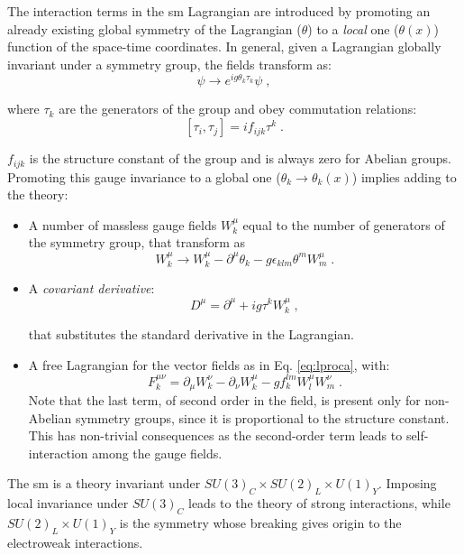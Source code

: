The interaction terms in the \gls{sm} Lagrangian are introduced by promoting an already existing global symmetry of the Lagrangian ($\theta$) to a \textit{local} one ($\theta(x)$) function of the space-time coordinates. 
In general, given a Lagrangian globally invariant under a symmetry group, the fields transform as:
\begin{equation}
\psi \rightarrow e^{ig\theta_k \tau_k} \psi  \; ,
\end{equation}

\noindent where $\tau_k$ are the generators of the group and obey commutation relations: 
\begin{equation}
\left[ \tau_i, \tau_j \right] = i f_{ijk} \tau^k \; . 
\end{equation}

\noindent $f_{ijk}$ is the structure constant of the group and is always zero for Abelian groups. Promoting this gauge invariance to a global one ($\theta_k \rightarrow \theta_k(x)$) implies adding to the theory:
\begin{itemize}
\item A number of massless gauge fields $W^\mu_k$ equal to the number of generators of the symmetry group, that transform as 
\begin{equation}
W^\mu_k \rightarrow W^\mu_k - \partial^\mu \theta_k - g \epsilon_{klm} \theta^m W^\mu_m \; .
\end{equation}
\item A \textit{covariant derivative}: 
\begin{equation}
D^\mu = \partial^\mu + ig\tau^kW^\mu_k \; ,
\end{equation}

\noindent that substitutes the standard derivative in the Lagrangian.
\item A free Lagrangian for the vector fields as in Eq. \ref{eq:lproca}, with:
\begin{equation}
F^{\mu \nu}_k = \partial_\mu W_k^\nu - \partial_\nu W_k^\mu - g f_k^{lm} W^\mu_l W^\nu_m \; .
\end{equation}
\noindent Note that the last term, of second order in the field, is present only for non-Abelian symmetry groups, since it is proportional to the structure constant. This has non-trivial consequences as the second-order term leads to self-interaction among the gauge fields.
\end{itemize}


The \gls{sm} is a theory invariant under $SU(3)_{C} \times SU(2)_{L} \times U(1)_{Y}$. Imposing local invariance under $SU(3)_{C}$ leads to the theory of strong interactions, while $SU(2)_{L} \times U(1)_{Y}$ is the symmetry whose breaking gives origin to the electroweak interactions. 


